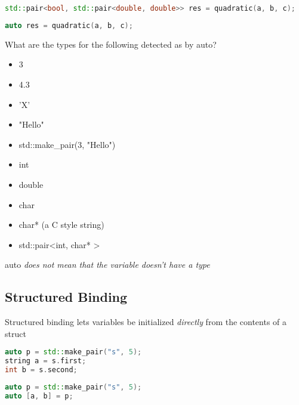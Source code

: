 \documentclass[]{article}
\begin{document}
\begin{lstlisting}[language=C++, numbers=none, caption=Writing the full type]
std::pair<bool, std::pair<double, double>> res = quadratic(a, b, c);
\end{lstlisting}

\begin{lstlisting}[language=C++, numbers=none, caption=The same code using auto]
auto res = quadratic(a, b, c);
\end{lstlisting}

\begin{question}
    What are the types for the following detected as by auto?
    \begin{itemize}
        \item 3
        \item 4.3
        \item 'X'
        \item "Hello"
        \item std::make\_pair(3, "Hello")
    \end{itemize}
\end{question}

\begin{answer}
    \begin{itemize}
        \item int
        \item double
        \item char
        \item char* (a C style string)
        \item std::pair\textless int, char* \textgreater
    \end{itemize}
\end{answer}

\begin{note}
    auto \emph{does not mean that the variable doesn't have a type}
\end{note}

\subsection{Structured Binding}
\begin{definition}
Structured binding lets variables be initialized \emph{directly} from the contents of a struct
\end{definition}
\begin{minipage}{0.5\linewidth}
\begin{lstlisting}[language=C++, caption=Before, numbers=none]
auto p = std::make_pair("s", 5);
string a = s.first;
int b = s.second;
\end{lstlisting}
\end{minipage}
\begin{minipage}{0.45\linewidth}
\begin{lstlisting}[language=C++, caption=After, numbers=none]
auto p = std::make_pair("s", 5);
auto [a, b] = p;
\end{lstlisting}
\end{minipage}
\end{document}
